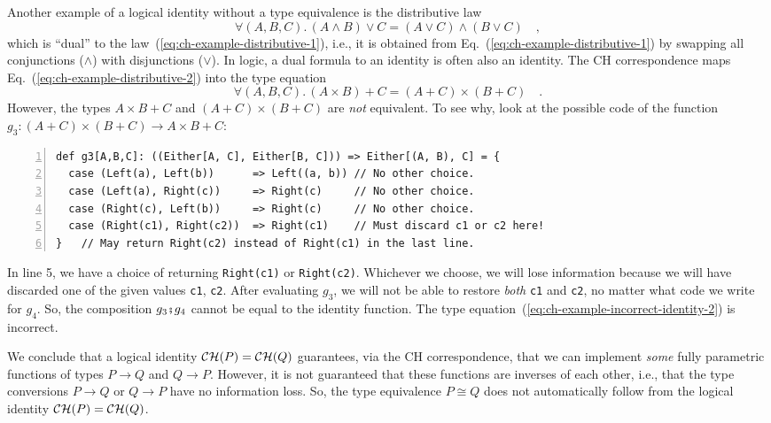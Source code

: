 Another example of a logical identity without a type equivalence is
the distributive law 
\begin{equation}
\forall(A,B,C).\,\left(A\wedge B\right)\vee C=\left(A\vee C\right)\wedge\left(B\vee C\right)\quad,\label{eq:ch-example-distributive-2}
\end{equation}
which is \textsf{``}dual\textsf{''} to the law~(\ref{eq:ch-example-distributive-1}),
i.e., it is obtained from Eq.~(\ref{eq:ch-example-distributive-1})
by swapping all conjunctions ($\wedge$) with disjunctions ($\vee$).
In logic, a dual formula to an identity is often also an identity.
The CH correspondence maps Eq.~(\ref{eq:ch-example-distributive-2})
into the type equation
\begin{equation}
\forall(A,B,C).\,\left(A\times B\right)+C=\left(A+C\right)\times\left(B+C\right)\quad.\label{eq:ch-example-incorrect-identity-2}
\end{equation}
However, the types $A\times B+C$ and $\left(A+C\right)\times\left(B+C\right)$
are \emph{not} equivalent. To see why, look at the possible code of
the function $g_{3}:\left(A+C\right)\times\left(B+C\right)\rightarrow A\times B+C$:
\begin{lstlisting}[numbers=left]
def g3[A,B,C]: ((Either[A, C], Either[B, C])) => Either[(A, B), C] = {
  case (Left(a), Left(b))      => Left((a, b)) // No other choice.
  case (Left(a), Right(c))     => Right(c)     // No other choice.
  case (Right(c), Left(b))     => Right(c)     // No other choice.
  case (Right(c1), Right(c2))  => Right(c1)    // Must discard c1 or c2 here!
}   // May return Right(c2) instead of Right(c1) in the last line.
\end{lstlisting}
In line 5, we have a choice of returning \lstinline!Right(c1)! or
\lstinline!Right(c2)!. Whichever we choose, we will lose information
because we will have discarded one of the given values \lstinline!c1!,
\lstinline!c2!. After evaluating $g_{3}$, we will not be able to
restore \emph{both} \lstinline!c1! and \lstinline!c2!, no matter
what code we write for $g_{4}$. So, the composition $g_{3}\bef g_{4}$
cannot be equal to the identity function. The type equation~(\ref{eq:ch-example-incorrect-identity-2})
is incorrect.

We conclude that a logical identity ${\cal CH}(P)={\cal CH}(Q)$ guarantees,
via the CH correspondence, that we can implement \emph{some} fully
parametric functions of types $P\rightarrow Q$ and $Q\rightarrow P$.
However, it is not guaranteed that these functions are inverses of
each other, i.e., that the type conversions $P\rightarrow Q$ or $Q\rightarrow P$
have no information loss. So, the type equivalence
$P\cong Q$ does not automatically follow from the logical identity
${\cal CH}(P)={\cal CH}(Q)$.

